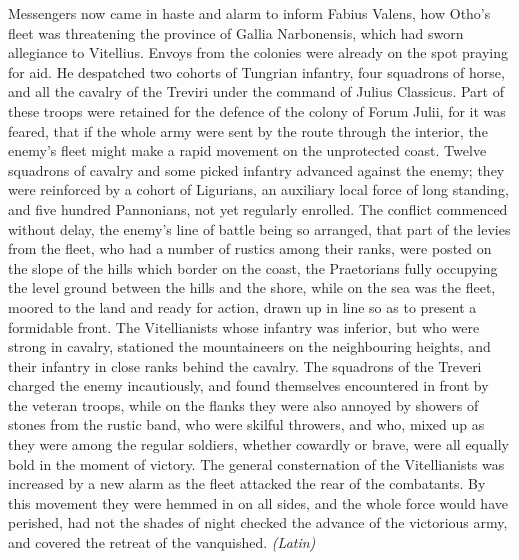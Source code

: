 
Messengers now came in haste and alarm to inform Fabius Valens, how Otho's fleet was threatening the province of Gallia Narbonensis, which had sworn allegiance to Vitellius. Envoys from the colonies were already on the spot praying for aid. He despatched two cohorts of Tungrian infantry, four squadrons of horse, and all the cavalry of the Treviri under the command of Julius Classicus. Part of these troops were retained for the defence of the colony of Forum Julii, for it was feared, that if the whole army were sent by the route through the interior, the enemy's fleet might make a rapid movement on the unprotected coast. Twelve squadrons of cavalry and some picked infantry advanced against the enemy; they were reinforced by a cohort of Ligurians, an auxiliary local force of long standing, and five hundred Pannonians, not yet regularly enrolled. The conflict commenced without delay, the enemy's line of battle being so arranged, that part of the levies from the fleet, who had a number of rustics among their ranks, were posted on the slope of the hills which border on the coast, the Praetorians fully occupying the level ground between the hills and the shore, while on the sea was the fleet, moored to the land and ready for action, drawn up in line so as to present a formidable front. The Vitellianists whose infantry was inferior, but who were strong in cavalry, stationed the mountaineers on the neighbouring heights, and their infantry in close ranks behind the cavalry. The squadrons of the Treveri charged the enemy incautiously, and found themselves encountered in front by the veteran troops, while on the flanks they were also annoyed by showers of stones from the rustic band, who were skilful throwers, and who, mixed up as they were among the regular soldiers, whether cowardly or brave, were all equally bold in the moment of victory. The general consternation of the Vitellianists was increased by a new alarm as the fleet attacked the rear of the combatants. By this movement they were hemmed in on all sides, and the whole force would have perished, had not the shades of night checked the advance of the victorious army, and covered the retreat of the vanquished. \emph{(Latin)}


